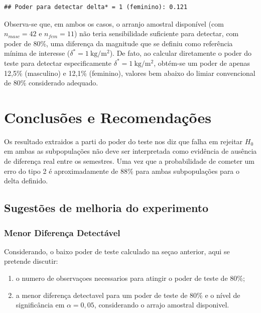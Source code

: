 \documentclass[
]{article}
\providecommand{\tightlist}{%
  \setlength{\itemsep}{0pt}\setlength{\parskip}{0pt}}
\begin{document}
\begin{verbatim}
## Poder para detectar delta* = 1 (feminino): 0.121
\end{verbatim}

Observa-se que, em ambos os casos, o arranjo amostral disponível (com \(n_{masc}=42\) e \(n_{fem}=11\)) não teria sensibilidade suficiente para detectar, com poder de 80\%, uma diferença da magnitude que se definiu como referência mínima de interesse (\(\delta^*=1\ \mathrm{kg/m^2}\)). De fato, ao calcular diretamente o poder do teste para detectar especificamente \(\delta^*=1\ \mathrm{kg/m^2}\), obtém-se um poder de apenas 12,5\% (masculino) e 12,1\% (feminino), valores bem abaixo do limiar convencional de 80\% considerado adequado.

\section{Conclusões e Recomendações}\label{conclusuxf5es-e-recomendauxe7uxf5es}

Os resultado extraidos a parti do poder do teste nos diz que falha em rejeitar \(H_0\) em ambas as subpopulações não deve ser interpretada como evidência de ausência de diferença real entre os semestres. Uma vez que a probabilidade de cometer um erro do tipo 2 é aproximadamente de 88\% para ambas subpopulações para o delta definido.

\subsection{Sugestões de melhoria do experimento}\label{sugestuxf5es-de-melhoria-do-experimento}

\subsubsection{Menor Diferença Detectável}\label{menor-diferenuxe7a-detectuxe1vel}

Considerando, o baixo poder de teste calculado na seçao anterior, aqui se pretende discutir:

\begin{enumerate}
\def\labelenumi{\arabic{enumi}.}
\tightlist
\item
  o numero de observaçoes necessarios para atingir o poder de teste de 80\%;
\item
  a menor diferença detectavel para um poder de teste de 80\% e o nível de significância em \(\alpha = 0{,}05\), considerando o arrajo amostral disponivel.
\end{enumerate}
\end{document}
